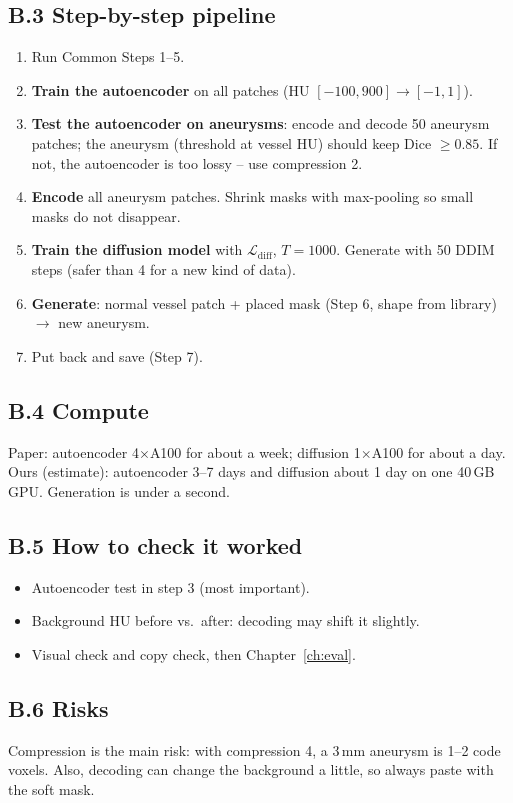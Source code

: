 \documentclass[11pt,a4paper,oneside]{report}
\newcommand{\Loss}{\mathcal{L}}
\begin{document}
\subsection*{B.3 Step-by-step pipeline}
\begin{enumerate}
  \item Run Common Steps 1--5.
  \item \textbf{Train the autoencoder} on all patches (HU $[-100,900]\rightarrow[-1,1]$).
  \item \textbf{Test the autoencoder on aneurysms}: encode and decode 50 aneurysm patches; the aneurysm (threshold at vessel HU) should keep Dice $\ge0.85$. If not, the autoencoder is too lossy -- use compression 2.
  \item \textbf{Encode} all aneurysm patches. Shrink masks with max-pooling so small masks do not disappear.
  \item \textbf{Train the diffusion model} with $\Loss_{\text{diff}}$, $T=1000$. Generate with 50 DDIM steps (safer than 4 for a new kind of data).
  \item \textbf{Generate}: normal vessel patch + placed mask (Step 6, shape from library) $\rightarrow$ new aneurysm.
  \item Put back and save (Step 7).
\end{enumerate}

\subsection*{B.4 Compute}
Paper: autoencoder 4$\times$A100 for about a week; diffusion 1$\times$A100 for about a day. Ours (estimate): autoencoder 3--7 days and diffusion about 1 day on one 40\,GB GPU. Generation is under a second.

\subsection*{B.5 How to check it worked}
\begin{itemize}
  \item Autoencoder test in step 3 (most important).
  \item Background HU before vs.\ after: decoding may shift it slightly.
  \item Visual check and copy check, then Chapter~\ref{ch:eval}.
\end{itemize}

\subsection*{B.6 Risks}
\begin{caution}
Compression is the main risk: with compression 4, a 3\,mm aneurysm is 1--2 code voxels. Also, decoding can change the background a little, so always paste with the soft mask.
\end{caution}
\end{document}
